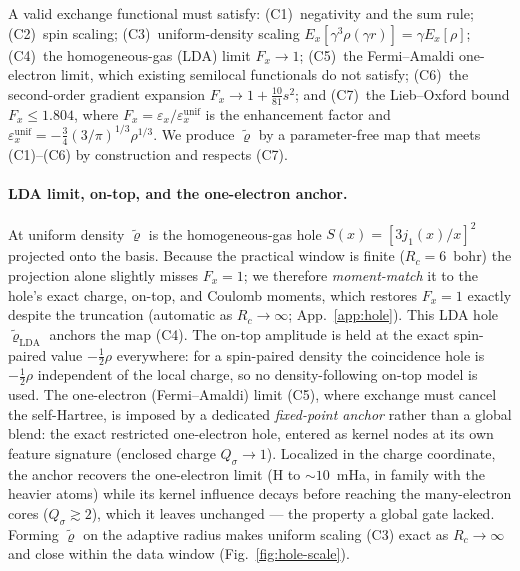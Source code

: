 \documentclass[aps,prb,reprint,superscriptaddress,nofootinbib]{revtex4-2}
\newcommand{\Rc}{R_{c}}
\begin{document}
A valid exchange functional must satisfy: (C1)~negativity and the sum rule; (C2)~spin scaling;
(C3)~uniform-density scaling $E_x[\gamma^3\rho(\gamma r)]=\gamma E_x[\rho]$; (C4)~the
homogeneous-gas (LDA) limit $F_x\to1$; (C5)~the Fermi--Amaldi one-electron limit, which existing
semilocal functionals do not satisfy; (C6)~the
second-order gradient expansion $F_x\to1+\tfrac{10}{81}s^2$; and (C7)~the Lieb--Oxford bound
$F_x\le1.804$, where $F_x=\varepsilon_x/\varepsilon_x^{\mathrm{unif}}$ is the enhancement factor and
$\varepsilon_x^{\mathrm{unif}}=-\tfrac34(3/\pi)^{1/3}\rho^{1/3}$. We produce $\tilde{\bm\varrho}$ by
a parameter-free map that meets (C1)--(C6) by construction and respects (C7).

\paragraph*{LDA limit, on-top, and the one-electron anchor.}
At uniform density $\tilde{\bm\varrho}$ is the homogeneous-gas hole $S(x)=[3j_1(x)/x]^2$ projected
onto the basis. Because the practical window is finite ($\Rc=6$~bohr) the projection alone slightly
misses $F_x=1$; we therefore \emph{moment-match} it to the hole's exact charge, on-top, and Coulomb
moments, which restores $F_x=1$ exactly despite the truncation (automatic as $\Rc\to\infty$;
App.~\ref{app:hole}). This LDA hole $\tilde{\bm\varrho}_{\mathrm{LDA}}$ anchors the map (C4). The
on-top amplitude is held at the exact spin-paired value $-\tfrac12\rho$ everywhere: for a spin-paired
density the coincidence hole is $-\tfrac12\rho$ independent of the local charge, so no density-following
on-top model is used. The one-electron (Fermi--Amaldi) limit (C5), where exchange must cancel the
self-Hartree, is imposed by a dedicated \emph{fixed-point anchor} rather than a global blend: the exact
restricted one-electron hole, entered as kernel nodes at its own feature signature (enclosed charge
$Q_\sigma\!\to\!1$). Localized in the charge coordinate, the anchor recovers the one-electron limit
(H to $\sim10$~mHa, in family with the heavier atoms) while its kernel influence decays before reaching
the many-electron cores ($Q_\sigma\gtrsim2$), which it leaves unchanged --- the property a global gate
lacked. Forming $\tilde{\bm\varrho}$ on the adaptive radius makes uniform scaling (C3) exact as
$\Rc\to\infty$ and close within the data window (Fig.~\ref{fig:hole-scale}).
\end{document}
